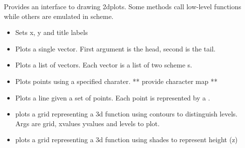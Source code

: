 \documentclass{article}
\begin{document}
{{{{{\label{2d-view}


Provides an interface to drawing 2dplots. Some methods call low-level functions while others are emulated in scheme.

\begin{itemize}
\item 
{}


Sets x, y and title labels


\item 
{}


Plots a single vector. First argument is the head, second is the tail.


\item 
{}


Plots a list of vectors. Each vector is a list of two scheme s.


\item 
{}


Plots points using a specified charater. ** provide character map **


\item 
{}


Plots a line given a set of points. Each point is represented by a .


\item 
{}


plots a grid representing a 3d function using contours to distinguish levels. Args are grid, xvalues yvalues and levels to plot.


\item 
{}


plots a grid representing a 3d function using shades to represent height (z)


\end{itemize}
\subsection{\scheme{3d-view%

\label{3d-view}


Provides an interface to drawing 3d plots. 

}}}}}}}
\end{document}
